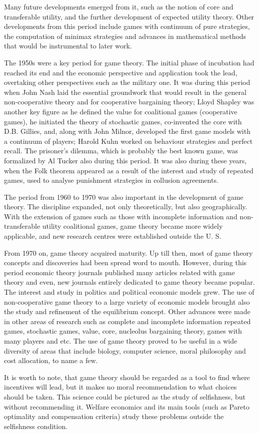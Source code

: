 \documentclass[]{report}
\begin{document}
Many future developments emerged from it, such as the notion of core and transferable utility, and the further development of expected utility theory. Other developments from this period include games with continuum of pure strategies, the computation of minimax strategies and advances in mathematical methods that would be instrumental to later work.

The 1950s were a key period for game theory. The initial phase of incubation had reached its end and the economic perspective and application took the lead, overtaking other perspectives such as the military one. It was during this period when John Nash laid the essential groundwork that would result in the general non-cooperative theory and for cooperative bargaining theory; Lloyd Shapley was another key figure as he defined the value for coalitional games (cooperative games), he initiated the theory of stochastic games, co-invented the core with D.B. Gillies, and, along with John Milnor, developed the first game models with a continuum of players; Harold Kuhn worked on behaviour strategies and perfect recall. The prisoner’s dilemma, which is probably the best known game, was formalized by Al Tucker also during this period. It was also during these years, when the Folk theorem appeared as a result of the interest and study of repeated games, used to analyse punishment strategies in collusion agreements.

The period from 1960 to 1970 was also important in the development of game theory. The discipline expanded, not only theoretically, but also geographically. With the extension of games such as those with incomplete information and non-transferable utility coalitional games, game theory became more widely applicable, and new research centres were established outside the U. S.

From 1970 on, game theory acquired maturity. Up till then, most of game theory concepts and discoveries had been spread word to mouth. However, during this period economic theory journals published many articles related with game theory and even, new journals entirely dedicated to game theory became popular. The interest and study in politics and political economic models grew. The use of non-cooperative game theory to a large variety of economic models brought also the study and refinement of the equilibrium concept. Other advances were made in other areas of research such as complete and incomplete information repeated games, stochastic games, value, core, nucleolus bargaining theory, games with many players and etc. The use of game theory proved to be useful in a wide diversity of areas that include biology, computer science, moral philosophy and cost allocation, to name a few.

It is worth to note, that game theory should be regarded as a tool to find where incentives will lead, but it makes no moral recommendation to what choices should be taken. This science could be pictured as the study of selfishness, but without recommending it.  Welfare economics and its main tools (such as Pareto optimality and compensation criteria) study these problems outside the selfishness condition.
\end{document}
